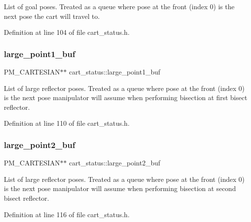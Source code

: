 List of goal poses. Treated as a queue where pose at the front (index 0) is the next pose the cart will travel to. 

Definition at line 104 of file cart\+\_\+status.\+h.

\mbox{\label{classcart__status_ab22c188f57ded9039c5bf65b56d14967}} 
\subsubsection{\texorpdfstring{large\+\_\+point1\+\_\+buf}{large\_point1\_buf}}
{\footnotesize\ttfamily P\+M\+\_\+\+C\+A\+R\+T\+E\+S\+I\+AN$\ast$$\ast$ cart\+\_\+status\+::large\+\_\+point1\+\_\+buf\hspace{0.3cm}{\ttfamily [private]}}

List of large reflector poses. Treated as a queue where pose at the front (index 0) is the next pose manipulator will assume when performing bisection at first bisect reflector. 

Definition at line 110 of file cart\+\_\+status.\+h.

\mbox{\label{classcart__status_aff6cd4f5352a807b290381b103d1fa7a}} 
\subsubsection{\texorpdfstring{large\+\_\+point2\+\_\+buf}{large\_point2\_buf}}
{\footnotesize\ttfamily P\+M\+\_\+\+C\+A\+R\+T\+E\+S\+I\+AN$\ast$$\ast$ cart\+\_\+status\+::large\+\_\+point2\+\_\+buf\hspace{0.3cm}{\ttfamily [private]}}

List of large reflector poses. Treated as a queue where pose at the front (index 0) is the next pose manipulator will assume when performing bisection at second bisect reflector. 

Definition at line 116 of file cart\+\_\+status.\+h.

\mbox{\label{classcart__status_a7ddb73db75439f687289c32c3e10d625}} 
